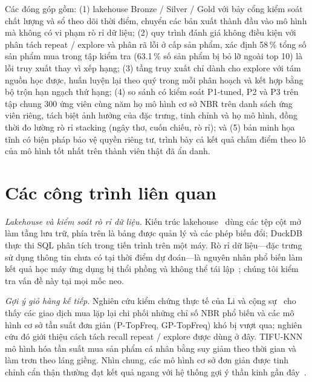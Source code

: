 \documentclass[jtehm]{ieeeaccess}
\newcommand{\nNoSource}{58}          %
\begin{document}
Các đóng góp gồm: (1) lakehouse Bronze / Silver / Gold với bảy cổng kiểm soát chất lượng và sổ theo dõi thời điểm, chuyển các bản xuất thành đầu vào mô hình mà không có vi phạm rò rỉ dữ liệu; (2) quy trình đánh giá không điều kiện với phân tách repeat / explore và phân rã lỗi ở cấp sản phẩm, xác định \nNoSource{}\,\% tổng số sản phẩm mua trong tập kiểm tra (63.1\,\% số sản phẩm bị bỏ lỡ ngoài top 10) là lỗi truy xuất thay vì xếp hạng; (3) tầng truy xuất chỉ dành cho explore với tám nguồn học được, huấn luyện lại theo quý trong mỗi phân hoạch và kết hợp bằng bộ trộn hạn ngạch thứ hạng; (4) so sánh có kiểm soát P1-tuned, P2 và P3 trên tập chung 300 ứng viên cùng năm họ mô hình cơ sở NBR trên danh sách ứng viên riêng, tách biệt ảnh hưởng của đặc trưng, tinh chỉnh và họ mô hình, đồng thời đo lường rò rỉ stacking (ngây thơ, cuốn chiếu, rò rỉ); và (5) bản minh họa tĩnh có biện pháp bảo vệ quyền riêng tư, trình bày cả kết quả chấm điểm theo lô của mô hình tốt nhất trên thành viên thật đã ẩn danh.

\section{Các công trình liên quan}
\label{sec:related}

\textit{Lakehouse và kiểm soát rò rỉ dữ liệu.} Kiến trúc lakehouse~\cite{armbrust2021lakehouse} dùng các tệp cột mở làm tầng lưu trữ, phía trên là bảng được quản lý và các phép biến đổi; DuckDB~\cite{raasveldt2019duckdb} thực thi SQL phân tích trong tiến trình trên một máy. Rò rỉ dữ liệu—đặc trưng sử dụng thông tin chưa có tại thời điểm dự đoán—là nguyên nhân phổ biến làm kết quả học máy ứng dụng bị thổi phồng và không thể tái lập~\cite{kapoor2023leakage}; chúng tôi kiểm tra vấn đề này tại mọi mốc neo.

\textit{Gợi ý giỏ hàng kế tiếp.} Nghiên cứu kiểm chứng thực tế của Li và cộng sự~\cite{li2023nbr} cho thấy các giao dịch mua lặp lại chi phối những chỉ số NBR phổ biến và các mô hình cơ sở tần suất đơn giản (P-TopFreq, GP-TopFreq) khó bị vượt qua; nghiên cứu đó giới thiệu cách tách recall repeat / explore được dùng ở đây. TIFU-KNN~\cite{hu2020tifu} mô hình hóa tần suất mua sản phẩm cá nhân bằng suy giảm theo thời gian và làm trơn theo láng giềng. Nhìn chung, các mô hình cơ sở đơn giản được tinh chỉnh cẩn thận thường đạt kết quả ngang với hệ thống gợi ý thần kinh gần đây~\cite{dacrema2019progress}.
\end{document}
